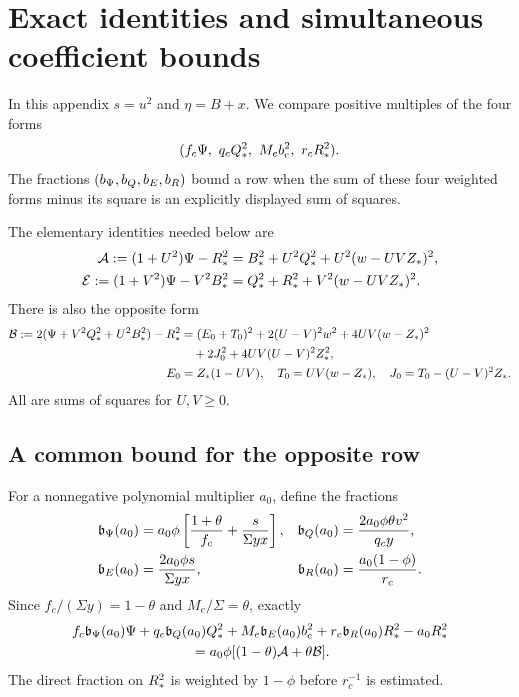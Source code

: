 \section{Exact identities and simultaneous coefficient bounds}\label{app:purchases}
In this appendix $s=u^2$ and $\eta=B+x$. We compare positive multiples
of the four forms
\[
 (f_c\Ps,\ q_c\Qh^2,\ M_e\bc^2,\ r_c\Rh^2).
\]
The fractions $(b_\Psi,b_Q,b_E,b_R)$ bound a row when
the sum of these four weighted forms minus its square is an explicitly
displayed sum of squares.

The elementary identities needed below are
\begin{align}
 \mathcal A:=(1+U^2)\Psi-R_*^2
   &=B_*^2+U^2Q_*^2+U^2(w-UVZ_*)^2,\notag\\
 \mathcal E:=(1+V^2)\Psi-V^2B_*^2
   &=Q_*^2+R_*^2+V^2(w-UVZ_*)^2 . \label{eq:elementary}
\end{align}
There is also the opposite form
\begin{align}
 \mathcal B:=2(\Psi+V^2Q_*^2+U^2B_*^2)-R_*^2
   &=(E_0+T_0)^2+2(U-V)^2w^2+4UV(w-Z_*)^2\notag\\
   &\quad+2J_0^2+4UV(U-V)^2Z_*^2,\notag\\
 E_0&=Z_*(1-UV),\quad T_0=UV(w-Z_*),\quad
 J_0=T_0-(U-V)^2Z_*. \label{eq:opposite}
\end{align}
All are sums of squares for $U,V\geq0$.

\subsection*{A common bound for the opposite row}
For a nonnegative polynomial multiplier $a_0$, define the fractions
\begin{align}
 \mathfrak b_\Psi(a_0)&=a_0\phi\left[\frac{1+\theta}{f_c}
                                      +\frac{s}{\Sigma yx}\right],&
 \mathfrak b_Q(a_0)&=\frac{2a_0\phi\theta v^2}{q_cy},\notag\\
 \mathfrak b_E(a_0)&=\frac{2a_0\phi s}{\Sigma yx},&
 \mathfrak b_R(a_0)&=\frac{a_0(1-\phi)}{r_c}.
 \label{eq:oppositefractions}
\end{align}
Since $f_c/(\Sigma y)=1-\theta$ and $M_e/\Sigma=\theta$, exactly
\begin{align}
 &f_c\mathfrak b_\Ps(a_0)\Ps+q_c\mathfrak b_Q(a_0)\Qh^2
 +M_e\mathfrak b_E(a_0)\bc^2+r_c\mathfrak b_R(a_0)\Rh^2-a_0\Rh^2
 \notag\\
 &\hspace{30mm}=a_0\phi[(1-\theta)\Aop+\theta\Bop].
 \label{eq:oppositepurchase}
\end{align}
The direct fraction on $R_*^2$ is weighted by $1-\phi$ before
$r_c^{-1}$ is estimated.

